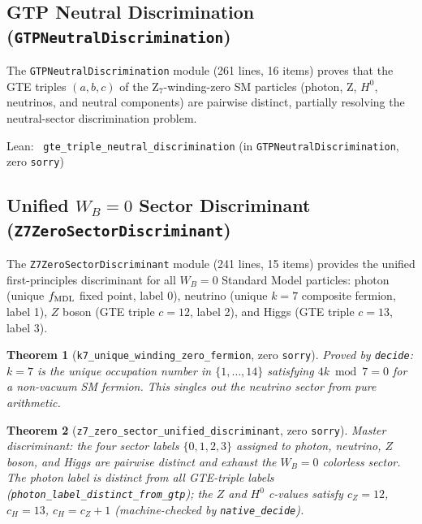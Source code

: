 \documentclass[11pt,a4paper]{article}
\newenvironment{leanref}%
  {\par\smallskip\noindent\begingroup\raggedright\textup{Lean:}~}%
  {\par\endgroup}
\newtheorem{theorem}{Theorem}[section]
\theoremstyle{definition}
\begin{document}
\subsection{GTP Neutral Discrimination (\texttt{GTPNeutralDiscrimination})}\label{subsec:gtp-neutral}

The \texttt{GTPNeutralDiscrimination} module (261 lines, 16 items) proves that the
GTE triples $(a, b, c)$ of the Z$_7$-winding-zero SM particles (photon, Z, $H^0$,
neutrinos, and neutral components) are pairwise distinct, partially resolving the
neutral-sector discrimination problem.

\begin{leanref}
\lstinline|gte_triple_neutral_discrimination|
\textup{(in \texttt{GTPNeutralDiscrimination}, zero \texttt{sorry})}
\end{leanref}

\subsection{Unified \texorpdfstring{$W_B{=}0$}{Z7=0} Sector Discriminant (\texttt{Z7ZeroSectorDiscriminant})}\label{subsec:z7-zero-sector}

The \texttt{Z7ZeroSectorDiscriminant} module (241 lines, 15 items) provides the
unified first-principles discriminant for all $W_B = 0$ Standard Model particles:
photon (unique $f_{\rm MDL}$ fixed point, label 0), neutrino (unique $k{=}7$
composite fermion, label 1), $Z$ boson (GTE triple $c=12$, label 2), and Higgs
(GTE triple $c=13$, label 3).

\begin{theorem}[\lstinline|k7_unique_winding_zero_fermion|, zero \texttt{sorry}]
Proved by \lstinline|decide|: $k=7$ is the unique occupation number in
$\{1,\ldots,14\}$ satisfying $4k \bmod 7 = 0$ for a non-vacuum SM fermion.
This singles out the neutrino sector from pure arithmetic.
\end{theorem}

\begin{theorem}[\lstinline|z7_zero_sector_unified_discriminant|, zero \texttt{sorry}]
Master discriminant: the four sector labels $\{0,1,2,3\}$ assigned to
photon, neutrino, $Z$ boson, and Higgs are pairwise distinct and exhaust
the $W_B=0$ colorless sector.  The photon label is distinct from all GTE-triple
labels (\lstinline|photon_label_distinct_from_gtp|); the $Z$ and $H^0$ c-values
satisfy $c_Z = 12$, $c_H = 13$, $c_H = c_Z + 1$ (machine-checked by
\lstinline|native_decide|).
\end{theorem}
\end{document}
